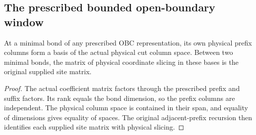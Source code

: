 \subsection{The prescribed bounded open-boundary window}
\label{sec:quadratic_prescribed_obc_window}

\begin{lemma}
    \label{lem:quadratic_prescribed_prefix_basis}
    \leanok
    At a minimal bond of any prescribed OBC representation, its own
    physical prefix columns form a basis of the actual physical cut
    column space. Between two minimal bonds, the matrix of physical
    coordinate slicing in these bases is the original supplied site
    matrix.
\end{lemma}
\begin{proof}
    \leanok
    The actual coefficient matrix factors through the prescribed
    prefix and suffix factors. Its rank equals the bond dimension,
    so the prefix columns are independent. The physical column
    space is contained in their span, and equality of dimensions
    gives equality of spaces. The original adjacent-prefix recursion
    then identifies each supplied site matrix with physical slicing.
\end{proof}


